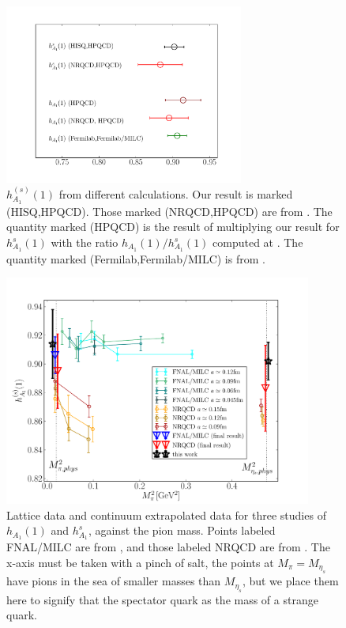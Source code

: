 \begin{figure}[htb!]
  \begin{center}
  \hspace{-20pt}
  \includegraphics[width=0.7\textwidth]{images/BsDsstar/comparisons.pdf}
  \caption{ $h_{A_1}^{(s)}(1)$ from different calculations. Our result is marked (HISQ,HPQCD). Those marked (NRQCD,HPQCD) are from \cite{Harrison:2017fmw}. The quantity marked (HPQCD) is the result of multiplying our result for $h^s_{A_1}(1)$ with the ratio $h_{A_1}(1)/h^s_{A_1}(1)$ computed at \cite{Harrison:2017fmw}. The quantity marked (Fermilab,Fermilab/MILC) is from \cite{Bailey:2014tva}. \label{fig:comparison_BsDsstar}}
  \end{center}
\end{figure}

\begin{figure}[htb!]
  \vspace{-20pt}
  \begin{center}
  \includegraphics[width=0.9\textwidth]{images/BsDsstar/fermilab_nrqcd_data.pdf}
  \caption{Lattice data and continuum extrapolated data for three studies of $h_{A_1}(1)$ and $h_{A_1}^s$, against the pion mass. Points labeled FNAL/MILC are from \cite{Bailey:2014tva}, and those labeled NRQCD are from \cite{Harrison:2017fmw}. The x-axis must be taken with a pinch of salt, the points at $M_{\pi}=M_{\eta_s}$ have pions in the sea of smaller masses than $M_{\eta_s}$, but we place them here to signify that the spectator quark as the mass of a strange quark. \label{fig:fermilab_data}}
  \end{center}
  \vspace{-20pt}
\end{figure}

